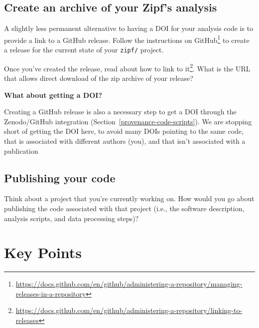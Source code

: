 \documentclass[
]{krantz}
\renewenvironment{quote}{\begin{VF}}{\end{VF}}
\renewcommand{\href}[2]{#2\footnote{\url{#1}}}
\begin{document}
\hypertarget{provenance-ex-release}{%
\subsection{Create an archive of your Zipf's analysis}\label{provenance-ex-release}}

A slightly less permanent alternative to having a DOI for your analysis code
is to provide a link to a GitHub release.
Follow \href{https://docs.github.com/en/github/administering-a-repository/managing-releases-in-a-repository}{the instructions on GitHub} to create a release for the current state of your \texttt{zipf/} project.

Once you've created the release,
\href{https://docs.github.com/en/github/administering-a-repository/linking-to-releases}{read about how to link to it}.
What is the URL that allows direct download of the zip archive
of your release?

\begin{quote}
\textbf{What about getting a DOI?}

Creating a GitHub release is also a necessary step
to get a DOI through the Zenodo/GitHub integration
(Section~\ref{provenance-code-scripts}).
We are stopping short of getting the DOI here,
to avoid many DOIs pointing to the same code,
that is associated with different authors (you),
and that isn't associated with a publication
\end{quote}

\hypertarget{provenance-ex-publish-code}{%
\subsection{Publishing your code}\label{provenance-ex-publish-code}}

Think about a project that you're currently working on.
How would you go about publishing the code associated with that project
(i.e., the software description, analysis scripts, and data processing steps)?

\hypertarget{publish-keypoints}{%
\section{Key Points}\label{publish-keypoints}}
\end{document}
